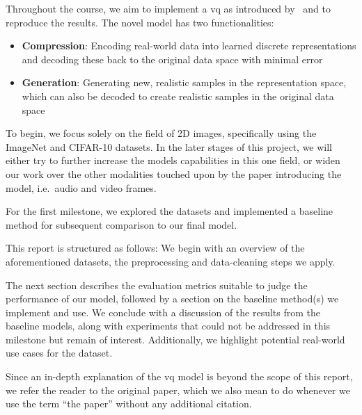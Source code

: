 Throughout the course, we aim to implement a \ac{vq} as introduced by~\cite{vqvae}
and to reproduce the results.
The novel model has two functionalities:
\begin{itemize}
    \item \textbf{Compression}: Encoding real-world data into learned discrete representations and decoding
    these back to the original data space with minimal error
    \item \textbf{Generation}: Generating new, realistic samples in the representation space, which can also be
    decoded to create realistic samples in the original data space
\end{itemize}
To begin, we focus solely on the field of 2D images, specifically using the ImageNet and CIFAR-10 datasets.
In the later stages of this project, we will either try to further increase the models capabilities in this one field,
or widen our work over the other modalities touched upon by the paper introducing the model, i.e.\ audio and video
frames.

For the first milestone, we explored the datasets and implemented a baseline method for subsequent comparison to our
final model.

This report is structured as follows: We begin with an overview of the aforementioned datasets, the preprocessing and
data-cleaning steps we apply.

The next section describes the evaluation metrics suitable to judge the performance of our model, followed by a
section on the baseline method(s) we implement and use.
We conclude with a discussion of the results from the baseline models, along with experiments that could not be addressed in this milestone but remain of interest. Additionally, we highlight potential real-world use cases for the dataset.

Since an in-depth explanation of the \ac{vq} model is beyond the scope of this report, we refer the reader to the
original paper,
which we also mean to do whenever we use the term ``the paper'' without any additional citation.
